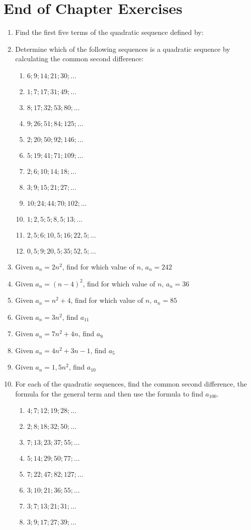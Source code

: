 \section{End of Chapter Exercises}
\begin{enumerate}
\item{Find the first five terms of the quadratic sequence defined by:
}
\item{Determine which of the following sequences is a quadratic sequence by calculating the common second difference:
\begin{enumerate}
\item $6; 9; 14; 21; 30;\ldots$
\item $1; 7; 17; 31; 49;\ldots$
\item $8; 17; 32; 53; 80;\ldots$
\item $9; 26; 51; 84; 125;\ldots$
\item $2; 20; 50; 92; 146;\ldots$
\item $5; 19; 41; 71; 109;\ldots$
\item $2; 6; 10; 14; 18;\ldots$
\item $3; 9; 15; 21; 27;\ldots$
\item $10; 24; 44; 70; 102;\ldots$
\item $1; 2,5; 5; 8,5; 13;\ldots$
\item $2,5; 6; 10,5; 16; 22,5;\ldots$
\item $0,5; 9; 20,5; 35; 52,5;\ldots$
\end{enumerate}}
\item{Given $a_n= 2n^2$, find for which value of $n$, $a_n=242$}
\item{Given $a_n= (n - 4)^2$, find for which value of $n$, $a_n=36$}
\item{Given $a_n= n^2+4$, find for which value of $n$, $a_n=85$}
\item{Given $a_n= 3n^2$, find $a_{11}$}
\item{Given $a_n= 7n^2+4n$, find $a_{9}$}
\item{Given $a_n= 4n^2+3n-1$, find $a_{5}$}
\item{Given $a_n= 1,5n^2$, find $a_{10}$}
\item{For each of the quadratic sequences, find the common second difference, the formula for the general term and then use the formula to find $a_{100}$.
\begin{enumerate}
\item $4;7;12;19;28;\ldots$
\item $2;8;18;32;50;\ldots$
\item $7;13;23;37;55;\ldots$
\item $5;14;29;50;77;\ldots$
\item $7;22;47;82;127;\ldots$
\item $3;10;21;36;55;\ldots$
\item $3;7;13;21;31;\ldots$
\item $3;9;17;27;39;\ldots$
\end{enumerate}}

\end{enumerate}







